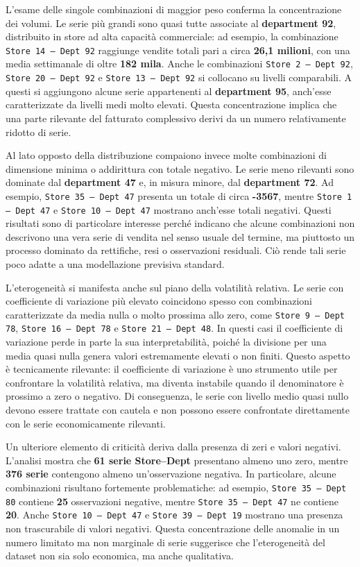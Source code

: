 \documentclass[a4paper,12pt]{article}
\begin{document}
L’esame delle singole combinazioni di maggior peso conferma la concentrazione dei volumi. Le serie più grandi sono quasi tutte associate al \textbf{department 92}, distribuito in store ad alta capacità commerciale: ad esempio, la combinazione \texttt{Store 14 -- Dept 92} raggiunge vendite totali pari a circa \textbf{26,1 milioni}, con una media settimanale di oltre \textbf{182 mila}. Anche le combinazioni \texttt{Store 2 -- Dept 92}, \texttt{Store 20 -- Dept 92} e \texttt{Store 13 -- Dept 92} si collocano su livelli comparabili. A questi si aggiungono alcune serie appartenenti al \textbf{department 95}, anch’esse caratterizzate da livelli medi molto elevati. Questa concentrazione implica che una parte rilevante del fatturato complessivo derivi da un numero relativamente ridotto di serie.

Al lato opposto della distribuzione compaiono invece molte combinazioni di dimensione minima o addirittura con totale negativo. Le serie meno rilevanti sono dominate dal \textbf{department 47} e, in misura minore, dal \textbf{department 72}. Ad esempio, \texttt{Store 35 -- Dept 47} presenta un totale di circa \textbf{-3567}, mentre \texttt{Store 1 -- Dept 47} e \texttt{Store 10 -- Dept 47} mostrano anch’esse totali negativi. Questi risultati sono di particolare interesse perché indicano che alcune combinazioni non descrivono una vera serie di vendita nel senso usuale del termine, ma piuttosto un processo dominato da rettifiche, resi o osservazioni residuali. Ciò rende tali serie poco adatte a una modellazione previsiva standard.

L’eterogeneità si manifesta anche sul piano della volatilità relativa. Le serie con coefficiente di variazione più elevato coincidono spesso con combinazioni caratterizzate da media nulla o molto prossima allo zero, come \texttt{Store 9 -- Dept 78}, \texttt{Store 16 -- Dept 78} e \texttt{Store 21 -- Dept 48}. In questi casi il coefficiente di variazione perde in parte la sua interpretabilità, poiché la divisione per una media quasi nulla genera valori estremamente elevati o non finiti. Questo aspetto è tecnicamente rilevante: il coefficiente di variazione è uno strumento utile per confrontare la volatilità relativa, ma diventa instabile quando il denominatore è prossimo a zero o negativo. Di conseguenza, le serie con livello medio quasi nullo devono essere trattate con cautela e non possono essere confrontate direttamente con le serie economicamente rilevanti.

Un ulteriore elemento di criticità deriva dalla presenza di zeri e valori negativi. L’analisi mostra che \textbf{61 serie Store--Dept} presentano almeno uno zero, mentre \textbf{376 serie} contengono almeno un’osservazione negativa. In particolare, alcune combinazioni risultano fortemente problematiche: ad esempio, \texttt{Store 35 -- Dept 80} contiene \textbf{25} osservazioni negative, mentre \texttt{Store 35 -- Dept 47} ne contiene \textbf{20}. Anche \texttt{Store 10 -- Dept 47} e \texttt{Store 39 -- Dept 19} mostrano una presenza non trascurabile di valori negativi. Questa concentrazione delle anomalie in un numero limitato ma non marginale di serie suggerisce che l’eterogeneità del dataset non sia solo economica, ma anche qualitativa.
\end{document}
